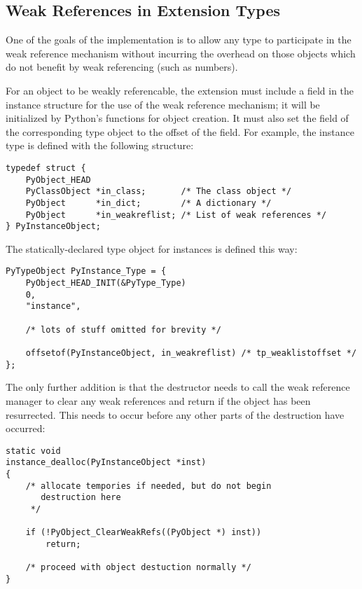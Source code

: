 \subsection{Weak References in Extension Types
            \label{weakref-extension}}

One of the goals of the implementation is to allow any type to
participate in the weak reference mechanism without incurring the
overhead on those objects which do not benefit by weak referencing
(such as numbers).

For an object to be weakly referencable, the extension must include a
 field in the instance structure for the use of the
weak reference mechanism; it will be initialized by Python's functions
for object creation.  It must also set the 
field of the corresponding type object to the offset of the field.
For example, the instance type is defined with the following structure:

\begin{verbatim}
typedef struct {
    PyObject_HEAD
    PyClassObject *in_class;       /* The class object */
    PyObject	  *in_dict;        /* A dictionary */
    PyObject	  *in_weakreflist; /* List of weak references */
} PyInstanceObject;
\end{verbatim}

The statically-declared type object for instances is defined this way:

\begin{verbatim}
PyTypeObject PyInstance_Type = {
    PyObject_HEAD_INIT(&PyType_Type)
    0,
    "instance",

    /* lots of stuff omitted for brevity */

    offsetof(PyInstanceObject, in_weakreflist) /* tp_weaklistoffset */
};
\end{verbatim}

The only further addition is that the destructor needs to call the
weak reference manager to clear any weak references and return if the
object has been resurrected.  This needs to occur before any other
parts of the destruction have occurred:

\begin{verbatim}
static void
instance_dealloc(PyInstanceObject *inst)
{
    /* allocate tempories if needed, but do not begin
       destruction here
     */

    if (!PyObject_ClearWeakRefs((PyObject *) inst))
        return;

    /* proceed with object destuction normally */
}
\end{verbatim}
